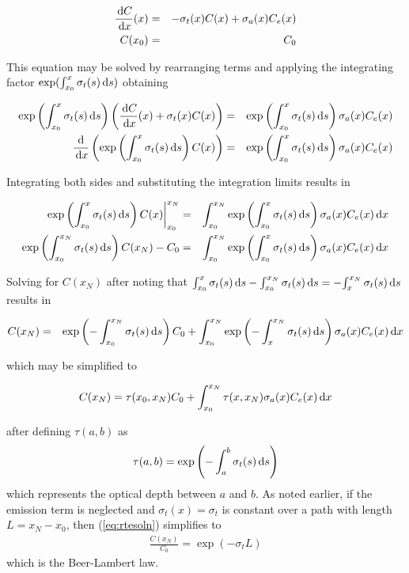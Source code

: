 \begin{eqnarray}
\frac{\,\mbox{d}C}{\,\mbox{d}x}(x)&=&-\sigma_t(x) C(x) + \sigma_a(x) C_e(x)\\
 C(x_0)&=&C_0
\end{eqnarray}

This equation may be solved by rearranging terms and applying the
integrating factor $\exp(\int_{x_0}^x \sigma_t(s) \,\mbox{d}s)$ obtaining

\begin{eqnarray}
\exp\left({\int_{x_0}^{x} \sigma_t(s) \,\mbox{d}s}\right)\left(\frac{\,\mbox{d}C}{\,\mbox{d}x}(x)+\sigma_t(x) C(x)\right)&=&  \exp\left({\int_{x_0}^{x} \sigma_t(s) \,\mbox{d}s}\right)\sigma_a(x) C_e(x)\\
\frac{\mbox{d}}{\,\mbox{d}x}\left(\exp\left({\int_{x_0}^{x} \sigma_t(s) \,\mbox{d}s}\right) C(x)\right)&=& \exp\left({\int_{x_0}^{x} \sigma_t(s) \,\mbox{d}s}\right)\sigma_a(x) C_e(x)
\end{eqnarray}

Integrating both sides and substituting the integration limits
results in

\begin{eqnarray}
\left.\exp\left({\int_{x_0}^{x} \sigma_t(s) \,\mbox{d}s}\right) C(x)\right|_{x_0}^{x_N}&=& \int_{x_0}^{x_N}\exp\left({\int_{x_0}^{x} \sigma_t(s) \,\mbox{d}s}\right)\sigma_a(x) C_e(x) \,\mbox{d}x \\
\exp\left({\int_{x_0}^{x_N} \sigma_t(s) \,\mbox{d}s}\right) C(x_N)-C_0&=& \int_{x_0}^{x_N}\exp\left({\int_{x_0}^{x} \sigma_t(s) \,\mbox{d}s}\right)\sigma_a(x) C_e(x) \,\mbox{d}x
\end{eqnarray}

Solving for $C(x_N)$ after noting that
${\int_{x_0}^{x} \sigma_t(s) \,\mbox{d}s}-{\int_{x_0}^{x_N} \sigma_t(s) \,\mbox{d}s}=-{\int_{x}^{x_N} \sigma_t(s) \,\mbox{d}s}$ results in

\begin{eqnarray}
C(x_N)&=&\exp\left({-\int_{x_0}^{x_N} \sigma_t(s) \,\mbox{d}s}\right) C_0+ \int_{x_0}^{x_N}\exp\left({-\int_{x}^{x_N} \sigma_t(s) \,\mbox{d}s}\right)\sigma_a(x)
C_e(x) \,\mbox{d}x
\end{eqnarray}

\noindent which may be simplified to

\begin{equation}
\label{eq:rtesoln}
 C(x_N)=\tau(x_0,x_N)C_0 + \int_{x_0}^{x_N}\tau(x,x_N)\siga\Le \dx{x}
\end{equation}

\noindent after defining $\tau(a,b)$ as
\begin{equation}
\label{eq:optdepth}
\tau(a,b)=\intmf{a}{b}
\end{equation}
which represents the optical depth between $a$ and $b$.  As noted earlier, if the emission term is neglected and $\sigma_t(x)=\sigma_t$ is constant over a path with length
$L=x_N-x_0$, then (\ref{eq:rtesoln}) simplifies to
\begin{eqnarray}
 \frac{C(x_N)}{C_0}=\exp(-\sigma_tL)
\end{eqnarray}
which is the Beer-Lambert law.


